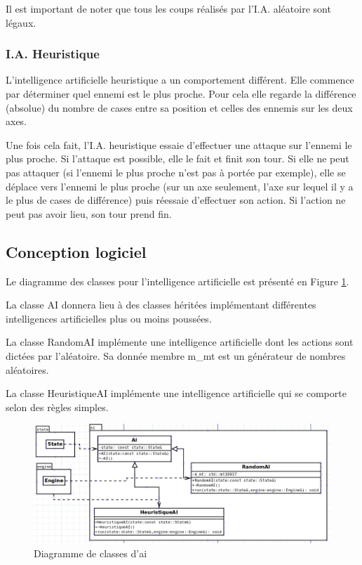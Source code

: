 \documentclass[a4paper,12pt]{article}
\begin{document}
Il est important de noter que tous les coups réalisés par l'I.A. aléatoire sont légaux.

\subsubsection{I.A. Heuristique}
L'intelligence artificielle heuristique a un comportement différent. Elle commence par déterminer quel ennemi est le plus proche. Pour cela elle regarde la différence (absolue) du nombre de cases entre sa position et celles des ennemis sur les deux axes.

Une fois cela fait, l'I.A. heuristique essaie d'effectuer une attaque sur l'ennemi le plus proche. Si l'attaque est possible, elle le fait et finit son tour. Si elle ne peut pas attaquer (si l'ennemi le plus proche n'est pas à portée par exemple), elle se déplace vers l'ennemi le plus proche (sur un axe seulement, l'axe sur lequel il y a le plus de cases de différence) puis réessaie d'effectuer son action. Si l'action ne peut pas avoir lieu, son tour prend fin.

\subsection{Conception logiciel}
Le diagramme des classes pour l'intelligence artificielle est présenté en Figure \ref{fig:randomai}.

La classe AI donnera lieu à des classes héritées implémentant différentes intelligences artificielles plus ou moins poussées.

La classe RandomAI implémente une intelligence artificielle dont les actions sont dictées par l'aléatoire. Sa donnée membre m\_mt est un générateur de nombres aléatoires.

La classe HeuristiqueAI implémente une intelligence artificielle qui se comporte selon des règles simples.

\begin{figure}[hbt!]
    \centering
    \includegraphics[width =.8\paperwidth, angle=0]{images/ai.png}
    \caption{Diagramme de classes d'ai}
    \label{fig:randomai}
\end{figure}
\end{document}

